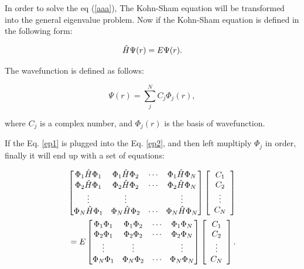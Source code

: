 \documentclass[a4paper, 12pt, titlepage,oneside,drop]{kthesis}
\begin{document}
In order to solve the eq (\ref{aaa}), The Kohn-Sham equation will be transformed into the general eigenvalue problem. Now if the Kohn-Sham equation is defined in the following form:

\begin{equation}\label{ep2}
 \hat{H} \Psi (r) = E \Psi (r).
\end{equation}
 

The wavefunction is defined as follows:

\begin{equation}\label{ep1}
 \Psi (r) = \sum\limits_j^N C_j \Phi_j (r),
\end{equation}
 
where $C_j$ is a complex number, and $\Phi_j (r)$ is the basis of wavefunction. 


If the Eq. \ref{ep1} is plugged into the Eq. \ref{ep2}, and then left mupltiply $\Phi_j$ in order, finally it will end up with a set of equations:

\begin{equation}\begin{split}\label{ep3}
\left[
\begin{matrix}
    \Phi_1 \hat{H} \Phi_1 & \Phi_1 \hat{H} \Phi_2 & \cdots & \Phi_1 \hat{H} \Phi_N \\
    \Phi_2 \hat{H} \Phi_1 & \Phi_2 \hat{H} \Phi_2 & \cdots & \Phi_2 \hat{H} \Phi_N \\
    \vdots               & \vdots               &        & \vdots               \\
    \Phi_N \hat{H} \Phi_1 & \Phi_N \hat{H} \Phi_2 & \cdots & \Phi_N \hat{H} \Phi_N \\
\end{matrix} \right] \left[ \begin{array}{c} C_1 \\ C_2 \\ \vdots \\ C_N\end{array} \right] \\
=E \left[
\begin{matrix}
    \Phi_1 \Phi_1 & \Phi_1 \Phi_2 & \cdots & \Phi_1 \Phi_N \\
   \Phi_2 \Phi_1 & \Phi_2 \Phi_2 & \cdots & \Phi_2 \Phi_N \\
    \vdots               & \vdots               &        & \vdots               \\
   \Phi_N \Phi_1 & \Phi_N \Phi_2 & \cdots & \Phi_N \Phi_N \\
\end{matrix} \right]\left[ \begin{array}{c} C_1 \\ C_2 \\ \vdots \\ C_N\end{array} \right].
\end{split}\end{equation}
\end{document}

